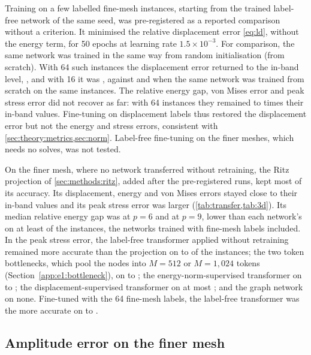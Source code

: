 Training on a few labelled fine-mesh instances, starting from the trained label-free
network of the same seed, was pre-registered as a reported comparison without a criterion. It minimised the relative displacement error
\eqref{eq:ld}, without the energy term, for 50 epochs at learning rate $1.5\times10^{-3}$. For
comparison, the same network was trained
in the same way from random initialisation (from scratch). With 64 such instances
the displacement error returned to the in-band level, \numFewSixtyFourDisp{}, and with 16 it
was \numFewSixteenDisp{}, against \numFewSixtyFourScratchDisp{} and
\numFewSixteenScratchDisp{} when the same network was trained from scratch on the same
instances. The relative energy gap, von Mises error and peak stress error did not recover as
far: with 64 instances they remained \numFewFactorMin{} to \numFewFactorMax{} times their
in-band values. Fine-tuning on displacement labels thus restored the displacement error but
not the energy and stress errors, consistent with \cref{sec:theory:metrics,sec:norm}.
Label-free fine-tuning on the finer meshes, which needs no solves, was not tested.

On the finer mesh, where no network transferred without retraining, the Ritz projection of
\cref{sec:methods:ritz}, added after the pre-registered runs, kept most of its accuracy. Its displacement, energy and
von Mises errors stayed close to their in-band values and its peak stress error was larger
(\cref{tab:transfer,tab:3d}). Its median relative energy gap was
\numRitzFineGapSix{} at $p=6$ and \numRitzFineGapNine{} at $p=9$, lower than each network's
on at least \numRitzFineGapAll{} of the instances, the networks trained with fine-mesh
labels included. In the peak stress error, the label-free transformer applied without retraining remained more
accurate than the projection on \numRitzFineFreePeakMin{} to \numRitzFineFreePeakMax{} of the
instances; the two token bottlenecks, which pool the nodes into $M=512$ or $M=1{,}024$ tokens
(Section~\ref{app:e1:bottleneck}), on \numRitzFineBnPeakMin{} to \numRitzFineBnPeakMax{}; the
energy-norm-supervised transformer on \numRitzFineKnormPeakMin{} to
\numRitzFineKnormPeakMax{}; the displacement-supervised transformer on at most
\numRitzFineLabPeakMax{}; and the graph network on none. Fine-tuned with the 64 fine-mesh
labels, the label-free transformer was the more accurate on
\numRitzFineFtPeakMin{} to \numRitzFineFtPeakMax{}.

\subsection{Amplitude error on the finer mesh}\label{sec:transfer:amplitude}

